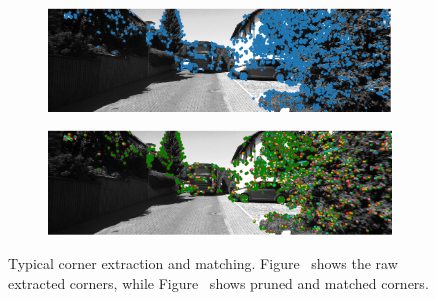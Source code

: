 \documentclass{article}
\begin{document}
\begin{figure}[!ht]
  \centering
  \begin{subfigure}{.45\linewidth}
    \centering
    \includegraphics[width=\linewidth]{10_001157_001158_raw_corners_left}
    \caption{}
    \label{fig:ex_corner_and_matching:corner}
  \end{subfigure}
  \begin{subfigure}{.45\linewidth}
    \includegraphics[width=\linewidth]{10_001157_001158_final_matches1}
    \caption{}
    \label{fig:ex_corner_and_matching:match}    
  \end{subfigure}
  \caption{Typical corner extraction and
    matching. Figure~ shows the raw
    extracted corners, while Figure~ shows
    pruned and matched corners.}
  \label{fig:ex_corner_and_matching}
\end{figure}
\end{document}
